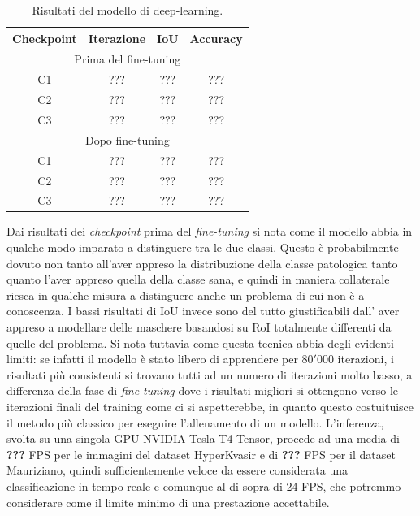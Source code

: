 \begin{table}
    \begin{tabular}{||c|c|c|c||}
    \hline
    Checkpoint & Iterazione & IoU & Accuracy \\
    \hline
    \hline
    \multicolumn{4}{||c||}{Prima del fine-tuning} \\
    \hline
    C1 & ??? & ??? & ??? \\
    C2 & ??? & ??? & ??? \\
    C3 & ??? & ??? & ??? \\
    \hline
    \multicolumn{4}{||c||}{Dopo fine-tuning} \\
    \hline
    C1 & ??? & ??? & ??? \\
    C2 & ??? & ??? & ??? \\
    C3 & ??? & ??? & ??? \\
    \hline
    \end{tabular}
    \caption{\label{tab:deep-learning-results}
    Risultati del modello di deep-learning.}
\end{table}

Dai risultati dei {\it checkpoint } prima
del {\it fine-tuning} si nota come il
modello abbia in qualche modo imparato
a distinguere tra le due classi.
Questo è probabilmente dovuto
non tanto all'aver appreso la
distribuzione della classe patologica
tanto quanto l'aver appreso quella
della classe sana, e quindi in
maniera collaterale riesca in qualche
misura a distinguere anche un problema
di cui non è a conoscenza.
I bassi risultati di IoU invece
sono del tutto giustificabili dall'
aver appreso a modellare delle maschere
basandosi su RoI totalmente differenti
da quelle del problema.
Si nota tuttavia come questa tecnica abbia
degli evidenti limiti:
se infatti il modello è stato libero
di apprendere per $80'000$ iterazioni,
i risultati più consistenti si trovano
tutti ad un numero di iterazioni molto
basso, a differenza della fase di
{\it fine-tuning} dove i risultati
migliori si ottengono verso le iterazioni
finali del training come ci si aspetterebbe,
in quanto questo costuituisce il metodo più
classico per eseguire l'allenamento di un
modello.
L'inferenza, svolta su una singola GPU
NVIDIA Tesla T4 Tensor, procede ad una media
di {\bf ???} FPS per le immagini del
dataset HyperKvasir e di {\bf ???} FPS
per il dataset Mauriziano, quindi
sufficientemente veloce da essere considerata
una classificazione in tempo reale e comunque
al di sopra di 24 FPS, che potremmo
considerare come il limite minimo
di una prestazione accettabile.



